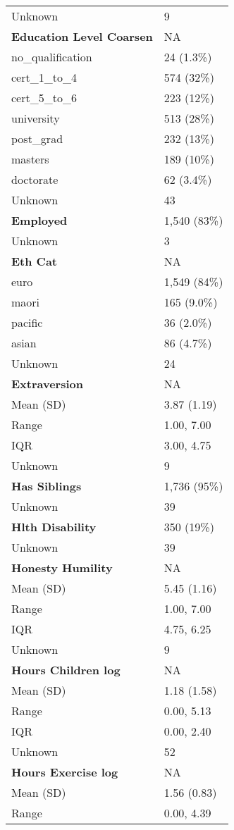 \documentclass[
  singlecolumn]{article}
\begin{document}
\begin{longtable}[]{@{}ll@{}}
Unknown & 9 \\
\textbf{Education Level Coarsen} & NA \\
no\_qualification & 24 (1.3\%) \\
cert\_1\_to\_4 & 574 (32\%) \\
cert\_5\_to\_6 & 223 (12\%) \\
university & 513 (28\%) \\
post\_grad & 232 (13\%) \\
masters & 189 (10\%) \\
doctorate & 62 (3.4\%) \\
Unknown & 43 \\
\textbf{Employed} & 1,540 (83\%) \\
Unknown & 3 \\
\textbf{Eth Cat} & NA \\
euro & 1,549 (84\%) \\
maori & 165 (9.0\%) \\
pacific & 36 (2.0\%) \\
asian & 86 (4.7\%) \\
Unknown & 24 \\
\textbf{Extraversion} & NA \\
Mean (SD) & 3.87 (1.19) \\
Range & 1.00, 7.00 \\
IQR & 3.00, 4.75 \\
Unknown & 9 \\
\textbf{Has Siblings} & 1,736 (95\%) \\
Unknown & 39 \\
\textbf{Hlth Disability} & 350 (19\%) \\
Unknown & 39 \\
\textbf{Honesty Humility} & NA \\
Mean (SD) & 5.45 (1.16) \\
Range & 1.00, 7.00 \\
IQR & 4.75, 6.25 \\
Unknown & 9 \\
\textbf{Hours Children log} & NA \\
Mean (SD) & 1.18 (1.58) \\
Range & 0.00, 5.13 \\
IQR & 0.00, 2.40 \\
Unknown & 52 \\
\textbf{Hours Exercise log} & NA \\
Mean (SD) & 1.56 (0.83) \\
Range & 0.00, 4.39 \\

\end{longtable}
\end{document}
